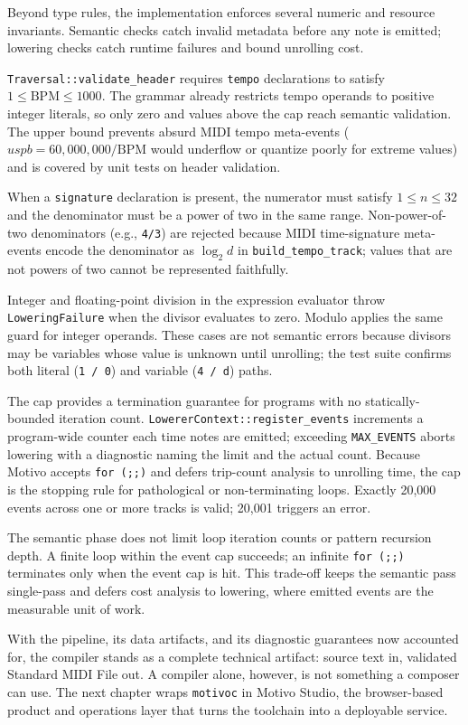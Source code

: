 Beyond type rules, the implementation enforces several numeric and resource invariants.
Semantic checks catch invalid metadata before any note is emitted; lowering checks catch runtime failures and bound
unrolling cost.

\texttt{Traversal::validate\_header} requires \texttt{tempo} declarations to satisfy $1 \leq \mathrm{BPM} \leq 1000$.
The grammar already restricts tempo operands to positive integer literals, so only zero and values above the cap reach
semantic validation.
The upper bound prevents absurd MIDI tempo meta-events ($uspb = 60{,}000{,}000 / \mathrm{BPM}$ would underflow or
quantize poorly for extreme values) and is covered by unit tests on header validation.

When a \texttt{signature} declaration is present, the numerator must satisfy $1 \leq n \leq 32$ and the denominator
must be a power of two in the same range.
Non-power-of-two denominators (e.g., \texttt{4/3}) are rejected because MIDI time-signature meta-events encode the
denominator as $\log_2 d$ in \texttt{build\_tempo\_track}; values that are not powers of two cannot be represented
faithfully.

Integer and floating-point division in the expression evaluator throw \texttt{LoweringFailure} when
the divisor evaluates to zero.
Modulo applies the same guard for integer operands.
These cases are not semantic errors because divisors may be variables whose value is unknown until unrolling; the test
suite confirms both literal (\texttt{1 / 0}) and variable (\texttt{4 / d}) paths.

The cap provides a termination guarantee for programs with no statically-bounded iteration count.
\texttt{LowererContext::register\_events} increments a program-wide counter each time notes are emitted; exceeding
\texttt{MAX\_EVENTS} aborts lowering with a diagnostic naming the limit and the actual count.
Because Motivo accepts \texttt{for (;;)} and defers trip-count analysis to unrolling time, the cap is the stopping rule
for pathological or non-terminating loops.
Exactly 20{,}000 events across one or more tracks is valid; 20{,}001 triggers an error.

The semantic phase does not limit loop iteration counts or pattern recursion depth.
A finite loop within the event cap succeeds; an infinite \texttt{for (;;)} terminates only when the event cap is hit.
This trade-off keeps the semantic pass single-pass and defers cost analysis to lowering, where emitted events are the
measurable unit of work.

With the pipeline, its data artifacts, and its diagnostic guarantees now accounted for, the compiler stands as a
complete technical artifact: source text in, validated Standard MIDI File out.
A compiler alone, however, is not something a composer can use.
The next chapter wraps \texttt{motivoc} in Motivo Studio, the browser-based product and operations layer that turns the
toolchain into a deployable service.
